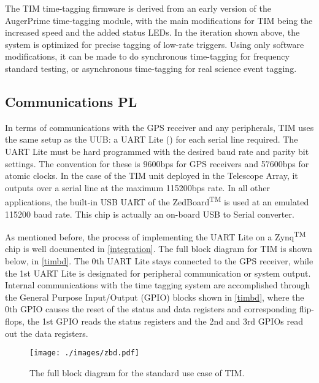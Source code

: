 The TIM time-tagging firmware is derived from an early version of the AugerPrime time-tagging module, with the main modifications for TIM being the increased speed and the added status LEDs. In the iteration shown above, the system is optimized for precise tagging of low-rate triggers. Using only software modifications, it can be made to do synchronous time-tagging for frequency standard testing, or asynchronous time-tagging for real science event tagging. 
\subsection{Communications PL}
In terms of communications with the GPS receiver and any peripherals, TIM uses the same setup as the UUB: a UART Lite (\cite{lite}) for each serial line required. The UART Lite must be hard programmed with the desired baud rate and parity bit settings. The convention for these is 9600bps for GPS receivers and 57600bps for atomic clocks. In the case of the TIM unit deployed in the Telescope Array, it outputs over a serial line at the maximum 115200bps rate. In all other applications, the built-in USB UART of the ZedBoard\textsuperscript{TM} is used at an emulated 115200 baud rate. This chip is actually an on-board USB to Serial converter. 

As mentioned before, the process of implementing the UART Lite on a Zynq\textsuperscript{TM} chip is well documented in \autoref{integration}. The full block diagram for TIM is shown below, in \autoref{timbd}. The 0th UART Lite stays connected to the GPS receiver, while the 1st UART Lite is designated for peripheral communication or system output. Internal communications with the time tagging system are accomplished through the General Purpose Input/Output (GPIO) blocks shown in \autoref{timbd}, where the 0th GPIO causes the reset of the status and data registers and corresponding flip-flops, the 1st GPIO reads the status registers and the 2nd and 3rd GPIOs read out the data registers.

\begin{figure}[H]
\centering
\texttt{[image: ./images/zbd.pdf]}
\caption[TIM PL Block Diagram]{The full block diagram for the standard use case of TIM.}
\label{timbd}
\end{figure}


